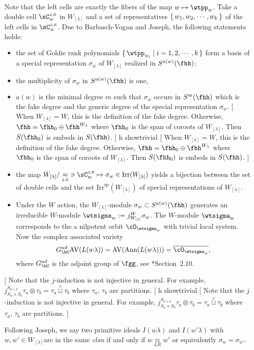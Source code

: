 \documentclass[12pt,a4paper]{amsart}
\newcommand{\trivial}[2][]{\if\relax\detokenize{#1}\relax
  {%
      \color{orange} \vspace{0em} $[$  #2 $]$
      \color{black}
  }
  \else
\ifx#1h
\ifcsname showtrivial\endcsname
{%
    \color{orange} \vspace{0em}  $[$ #2 $]$
    \color{black}
}
\fi
\else {\red Wrong argument!} \fi
\fi
}
\newcommand{\AV}{\mathrm{AV}}
\DeclareMathOperator{\Ann}{Ann}
\numberwithin{equation}{section}
\theoremstyle{remark}
\def\Irr{\mathrm{Irr}}
\def\Irrsp{\mathrm{Irr}^{\text{sp}}}
\def\Gc{G_\bC}
\def\CLR{{\sC}^{\scriptscriptstyle LR}}
\def\LC{{}^{\scriptscriptstyle L}\sC}
\def\LRC{{}^{\scriptscriptstyle LR}\sC}
\def\cupcol{{\stackrel{c}{\sqcup}}}
\def\approxLR{\mathrel{\mathop{\approx}\limits_{\scriptscriptstyle LR}}}
\begin{document}
Note that the left cells are exactly the fibers of the map $w\mapsto \wtpp_{w}$.
Take a double cell $\CLR_{w}$ in $W_{[\lambda]}$ and a set of representatives
$\set{w_{1}, w_{2}, \cdots, w_{k}}$ of the left cells in $\CLR_{w}$.
%
Due to Barbasch-Vogan\cite{BV1,BV2} and Joseph\cite{J1,J2,J3,J.av},  the following
statements holds:
\begin{itemize}
  \item the set of Goldie rank polynomials
  $\set{\wtpp_{w_{i}}|i = 1,2,\cdots,k}$ form a basis of a special
  representation $\sigma_{w}$ of $W_{[\lambda]}$ realized in
  $S^{a(w)}(\fhh)$;
  \item the multiplicity of $\sigma_{w}$ in $S^{a(w)}(\fhh)$ is one,
  \item $a(w)$ is the minimal degree $m$ such that $\sigma_{w}$ occurs in
  $S^{m}(\fhh)$ which is the fake degree and the generic degree of the special
        representation $\sigma_{w}$. \trivial[]{ When
    $W_{[\lambda]} = W$, this is the definition of the fake degree.
    Otherwise, $\fhh = \fhh_{0}\oplus \fhh^{W_{\lambda}}$ where $\fhh_{0}$
    is the span of coroots of $W_{[\lambda]}$. Then $S(\fhh_{0})$ is embeds
    in $S(\fhh)$. }
  \item the map
  $W_{[\lambda]}/\approxLR \; \ni \CLR_{w}\mapsto \sigma_{w}\in \Irr(W_{[\lambda]})$
  yields a bijection between the set of double cells and the set
  $\Irrsp(W_{[\lambda]})$ of special representations of $W_{[\lambda]}$.
  \item Under the $W$ action, the $W_{[\lambda]}$-module
  $\sigma_{w}\subset S^{a(w)}(\fhh)$ generates an irreducible $W$-module
  $\wtsigma_{w}:=j_{W_{[\lambda]}}^{W}\sigma_{w}$. The $W$-module
  $\wtsigma_{w}$ corresponds to the a nilpotent orbit $\cO_{\wtsigma_{w}}$
  with trivial local system. Now the complex associated variety
  \[
    \Gc^{ad}\AV(L(w\lambda)) = \AV(\Ann(L(w\lambda))) =\overline{\cO_{\wtsigma_{w}}},
  \]
  where $\Gc^{ad}$ is the adjoint group of $\fgg$, see
  \cite{J.av}*{Section~2.10}.
\end{itemize}
\trivial[]{
  Note that the $j$-induction is not injective in general.
  For example,
  $j_{S_{a}\times S_{b}}^{S_{a+b}} \tau_{a}\otimes \tau_{b} = \tau_{a}\cupcol \tau_{b}$
  where $\tau_{a}$, $\tau_{b}$ are partitions.
}

Following Joseph, we say two primitive ideals $I(w\lambda)$ and  $I(w'\lambda)$
with $w, w'\in W_{[\lambda]}$are in the same
\emph{clan} if and only if $w\approxLR w'$ or equivalently $\sigma_{w}=\sigma_{w'}$.
\end{document}
